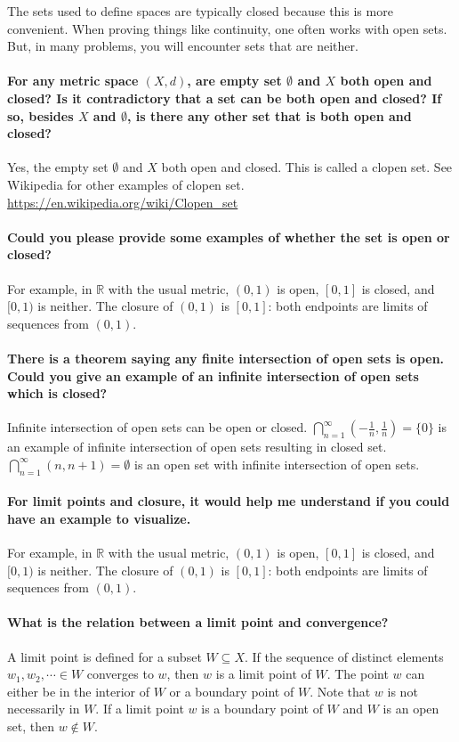 \documentclass[10pt,english]{article}
\begin{document}
The sets used to define spaces are typically closed because this is more convenient.
When proving things like continuity, one often works with open sets.
But, in many problems, you will encounter sets that are neither.

\paragraph{For any metric space $(X, d)$, are empty set $\emptyset$ and $X$ both open and closed? Is it contradictory that a set can be both open and closed? If so, besides $X$ and $\emptyset$, is there any other set that is both open and closed?}

Yes, the empty set $\emptyset$ and $X$ both open and closed. This is called a clopen set. See Wikipedia for other examples of clopen set. \url{https://en.wikipedia.org/wiki/Clopen_set}


\paragraph{Could you please provide some examples of whether the set is open or closed?}

For example, in $\mathbb{R}$ with the usual metric, $(0,1)$ is open, $[0,1]$ is closed, and $[0,1)$ is neither.
The closure of $(0,1)$ is $[0,1]$: both endpoints are limits of sequences from $(0,1)$.

\paragraph{There is a theorem saying any finite intersection of open sets is open. Could you give an example of an infinite intersection of open sets which is closed?}

Infinite intersection of open sets can be open or closed. $\bigcap_{n=1}^{\infty}\left(-\frac{1}{n}, \frac{1}{n}\right) = \{0\}$ is an example of infinite intersection of open sets resulting in closed set. $\bigcap_{n=1}^{\infty}(n, n+1) = \emptyset$ is an open set with infinite intersection of open sets.


\paragraph{For limit points and closure, it would help me understand if you could have an example to visualize.}

For example, in $\mathbb{R}$ with the usual metric, $(0,1)$ is open, $[0,1]$ is closed, and $[0,1)$ is neither.
The closure of $(0,1)$ is $[0,1]$: both endpoints are limits of sequences from $(0,1)$.

\paragraph{What is the relation between a limit point and convergence?}

A limit point is defined for a subset $W \subseteq X$. If the sequence of distinct elements $w_1, w_2, \cdots \in W$ converges to $w$, then $w$ is a limit point of $W$. The point $w$ can either be in the interior of $W$ or a boundary point of $W$. Note that $w$ is not necessarily in $W$. If a limit point $w$ is a boundary point of $W$ and $W$ is an open set, then $w \notin W$.
\end{document}
